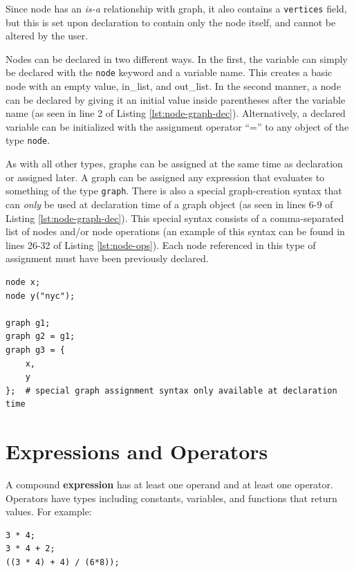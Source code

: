 \documentclass{article}
\newcommand{\code}[1]{\texttt{#1}} %
\begin{document}
Since node has an \emph{is-a} relationship with graph, it also contains a \code{vertices} field, but this is set upon declaration to contain only the node itself, and cannot be altered by the user.

Nodes can be declared in two different ways. In the first, the variable can simply be declared with the \code{node} keyword and a variable name. This creates a basic node with an empty value, in\_list, and out\_list. In the second manner, a node can be declared by giving it an initial value inside parentheses after the variable name (as seen in line 2 of Listing \ref{lst:node-graph-dec}). Alternatively, a declared variable can be initialized with the assignment operator ``='' to any object of the type \code{node}.

As with all other types, graphs can be assigned at the same time as declaration or assigned later. A graph can be assigned any expression that evaluates to something of the type \code{graph}. There is also a special graph-creation syntax that can \emph{only} be used at declaration time of a graph object  (as seen in lines 6-9 of Listing \ref{lst:node-graph-dec}). This special syntax consists of a comma-separated list of nodes and/or node operations (an example of this syntax can be found in lines 26-32 of Listing \ref{lst:node-ops}). Each node referenced in this type of assignment must have been previously declared. \\

\begin{lstlisting}[language=pltLang, caption=Declaration of ``node'' and ``graph'' objects., label=lst:node-graph-dec]
node x;
node y("nyc");

graph g1;
graph g2 = g1;
graph g3 = { 
    x,
    y
};  # special graph assignment syntax only available at declaration time

\end{lstlisting}

\section{Expressions and Operators}

A compound \textbf{expression} has at least one operand and at least one operator. Operators have types including constants, variables, and functions that return values. For example:

\begin{lstlisting}[language=pltLang, caption=demonstration of expressions and subexpressions, label=lst:expr]
3 * 4; 
3 * 4 + 2;
((3 * 4) + 4) / (6*8));

\end{lstlisting} 
\end{document}
